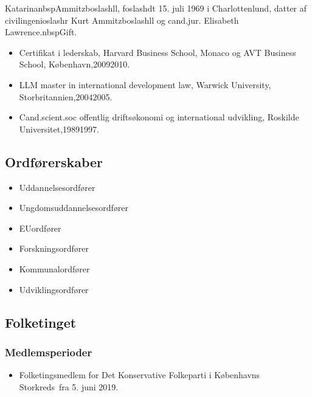 \documentclass[11pt, a4paper]{awesome-cv}
\begin{document}
\makecvheader[R]
\makelettertitle
\begin{cvletter}
KatarinanbspAmmitzboslashll, foslashdt 15. juli 1969 i Charlottenlund, datter af civilingenioslashr Kurt Ammitzboslashll og cand.jur. Elisabeth Lawrence.nbspGift.

\begin{itemize}
\item Certifikat i lederskab, Harvard Business School, Monaco og AVT Business School, København,20092010.
\item LLM master in  international development law, Warwick University, Storbritannien,20042005.
\item Cand.scient.soc offentlig driftsøkonomi og international udvikling, Roskilde Universitet,19891997.
\end{itemize}
\subsection*{Ordførerskaber}
\begin{itemize}
\item Uddannelsesordfører
\item Ungdomsuddannelsesordfører
\item EUordfører
\item Forskningsordfører
\item Kommunalordfører
\item Udviklingsordfører
\end{itemize}
\subsection*{Folketinget}
\subsubsection*{Medlemsperioder}
\begin{itemize}
\item Folketingsmedlem for Det Konservative Folkeparti i Københavns Storkreds fra 5. juni 2019.
\end{itemize}

\end{cvletter}
\end{document}
